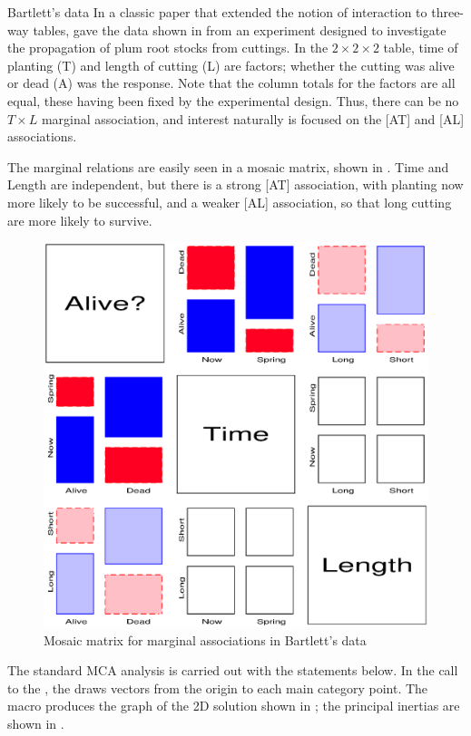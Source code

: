 \begin{Example}[bartlett]{Bartlett's data}
In a classic paper that extended the notion of interaction to three-way
tables, \citet{Bartlett:35} gave the data shown in 
from an experiment designed to investigate the propagation of
plum root stocks from cuttings.
In the $2 \times 2 \times 2$ table, time of planting (T) and length
of cutting (L) are factors; whether the cutting was alive or dead (A)
was the response.
Note that the column totals for the factors are all equal,
these having been fixed by the experimental design.
Thus, there can be
no $T\times L$ marginal association, and interest naturally is focused
on the [AT] and [AL] associations.


The marginal relations are easily seen in a mosaic matrix, shown in
. Time and Length are independent, but
there is a strong [AT] association, with planting
now more likely to be successful, and a weaker [AL] association,
so that long cutting are more likely to survive.

\begin{figure}[htb]
  \centering
  \includegraphics[scale=.7,clip]{ch5/fig/mosmat1m}
  \caption{Mosaic matrix for marginal associations in Bartlett's data}\label{fig:mosmat1m}
\end{figure}
The standard MCA analysis is carried out with the statements below.
In the call to the , the 
draws vectors from the origin to each main category point.
The macro produces the graph of the 2D solution shown in ; the principal inertias are shown in
.



\end{Example}
